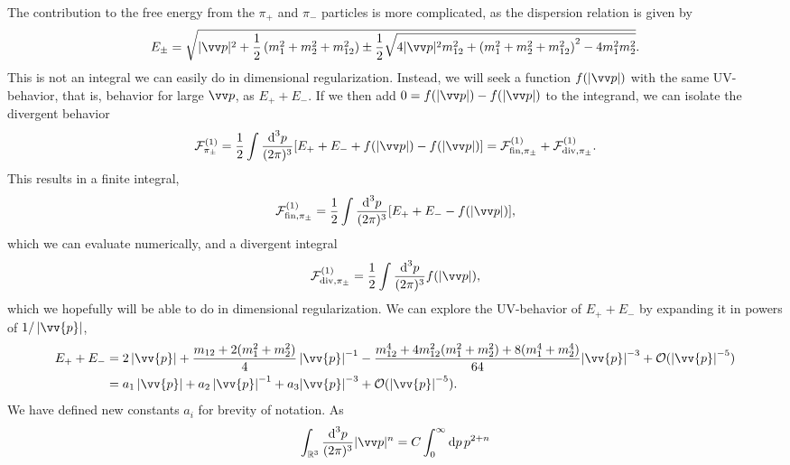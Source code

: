 The contribution to the free energy from the $\pi_+$ and $\pi_-$ particles is more complicated, as the dispersion relation is given by
%
\begin{equation}
    E_\pm
    = 
    \sqrt{
        |\vv p|^2 +
        \frac{1}{2}
        \left(
            m_1^2 + m_2^2 + m_{12}^2 
        \right)
        \pm 
        \frac{1}{2}
        \sqrt{
            4|\vv p|^2m_{12}^2 
            +
            \left(
                m_1^2 + m_2^2 + m_{12}^2
            \right)^2
            - 4 m_1^2 m_2^2
        }
    }.
\end{equation}
%
This is not an integral we can easily do in dimensional regularization.
Instead, we will seek a function $f(|\vv p|)$ with the same UV-behavior, that is, behavior for large $\vv p$, as $E_+ + E_-$.
If we then add $0 = f(|\vv p|) - f(|\vv p|)$ to the integrand, we can isolate the divergent behavior
%
\begin{equation}
    \Eff_{\pi_\pm}^{(1)}
    = 
    \frac{1}{2} \int \frac{\dd^3 p}{(2\pi)^3} [E_+ + E_- + f(|\vv p|) - f(|\vv p|)]
    = \Eff^{(1)}_{\mathrm{fin}, \pi_\pm } + \Eff^{(1)}_{\mathrm{div}, \pi_\pm}.
\end{equation}
%
This results in a finite integral,
%
\begin{equation}
    \Eff^{(1)}_{\mathrm{fin}, \pi_\pm } = \frac{1}{2} \int \frac{\dd^3 p}{(2\pi)^3} [E_+ + E_- - f(|\vv p|)],
\end{equation}
%
which we can evaluate numerically, and a divergent integral
%
\begin{equation}
    \Eff^{(1)}_{\mathrm{div}, \pi_\pm }
    = 
    \frac{1}{2} \int \frac{\dd^3 p}{(2\pi)^3} f(|\vv p|),
\end{equation}
%
which we hopefully will be able to do in dimensional regularization.
We can explore the UV-behavior of $E_+ + E_-$ by expanding it in powers of $1 / \abs{\vv{p}}$,
%
\begin{align}
    \nonumber
    E_+ + E_-
    & = 
    2  \abs{\vv{p}}
    + \frac{m_{12} + 2(m_1^2 + m_2^2)}{4} \, {\abs{\vv{p}}}^{-1}
    - \frac{m_{12}^4 + 4 m_{12}^2(m_1^2 + m_2^2) + 8(m_1^4 + m_2^4)}{64}
    {\abs{\vv{p}}}^{-3}
    + \Oh (\abs{\vv{p}}^{-5})
    \\
    & = 
    a_1  \abs{\vv{p}}
    + a_2 \, {\abs{\vv{p}}}^{-1}
    + a_3
    {\abs{\vv{p}}}^{-3}
    + \Oh (\abs{\vv{p}}^{-5}).
\end{align}
%
We have defined new constants $a_i$ for brevity of notation.
As
%
\begin{equation}
    \int_{\R^3} \frac{\dd^3 p}{(2 \pi)^3} |\vv p|^{n}
    = C \int_{0}^\infty \dd p \, p^{2 + n}
\end{equation}
